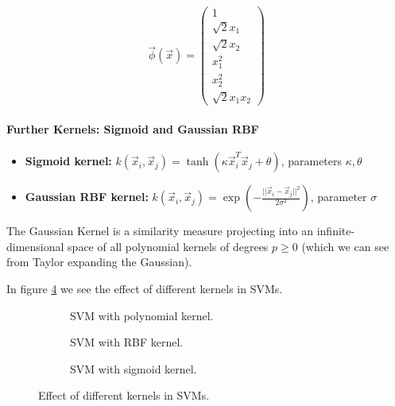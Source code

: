 \begin{equation}
    \vec{\phi}(\vec{x}) = \begin{pmatrix}
    1 \\ \sqrt{2} x_1 \\ \sqrt{2} x_2 \\ x_1^2 \\ x_2^2 \\ \sqrt{2} x_1 x_2
    \end{pmatrix}
\end{equation}

\paragraph*{Further Kernels: Sigmoid and Gaussian RBF}
\begin{itemize}
    \item \textbf{Sigmoid kernel:} $k(\vec{x}_i, \vec{x}_j) = \tanh(\kappa \vec{x}_i^T \vec{x}_j + \theta)$, parameters $\kappa, \theta$
    \item \textbf{Gaussian RBF kernel:} $k(\vec{x}_i, \vec{x}_j) = \exp\left(-\frac{||\vec{x}_i - \vec{x}_j||^2}{2\sigma^2}\right)$, parameter $\sigma$
\end{itemize}
The Gaussian Kernel is a similarity measure projecting 
into an infinite-dimensional space of all polynomial kernels 
of degrees $p \geq 0$ (which we can see from Taylor 
expanding the Gaussian).

In figure \ref{fig:kernel_trick} we see the effect of different kernels in SVMs.

\begin{figure}

    \centering
    \begin{subfigure}{0.45\textwidth}
      \centering
      
      \caption{SVM with polynomial kernel.}
      \label{fig:poly_kernel}
    \end{subfigure}%



    \begin{subfigure}{0.45\textwidth}
      \centering
      
      \caption{SVM with RBF kernel.}
      \label{fig:rbf_kernel}
    \end{subfigure}



    \begin{subfigure}{0.45\textwidth}
        \centering
        
        \caption{SVM with sigmoid kernel.}
        \label{fig:sigmoid_kernel}
      \end{subfigure}

    \caption{Effect of different kernels in SVMs.}
    \label{fig:kernel_trick}

\end{figure}

